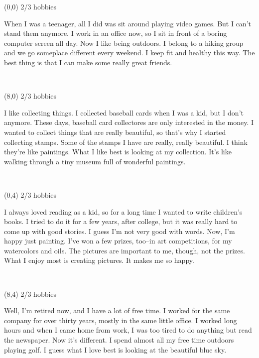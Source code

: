 \documentclass[a4paper]{article}
\newcommand{\mycard}[5]{%
	\vspace{0.1cm}
	\small #1 #2
	\par
	\parbox[t][6.7cm][c]{9.5cm}{%
	\hspace{0.1cm} \large#3 \\
	\normalsize#4 #5
	}
}
\begin{document}
\begin{textblock}{8}(0,0)
\mycard{2/3}{hobbies}{\parbox{9.0cm}{
When I was a teenager, all I did was sit around playing video games. But I can't stand them anymore. I work in an office now, so I sit in front of a boring computer screen all day. Now I like being outdoors. I belong to a hiking group and we go someplace different every weekend. I keep fit and healthy this way. The best thing is that I can make some really great friends.
}}{}{} 
\end{textblock}

\begin{textblock}{8}(8,0)
\mycard{2/3}{hobbies}{\parbox{9.0cm}{
I like collecting things. I collected baseball cards when I was a kid, but I don't anymore. These days, baseball card collectores are only interested in the money. I wanted to collect things that are really beautiful, so that's why I started collecting stamps. Some of the stamps I have are really, really beautiful. I think they're like paintings. What I like best is looking at my collection. It's like walking through a tiny museum full of wonderful paintings.
}}{}{} 
\end{textblock}

\begin{textblock}{8}(0,4)
\mycard{2/3}{hobbies}{\parbox{9.0cm}{
I always loved reading as a kid, so for a long time I wanted to write children's books. I tried to do it for a few years, after college, but it was really hard to come up with good stories. I guess I'm not very good with words. Now, I'm happy just painting. I've won a few prizes, too--in art competitions, for my watercolors and oils. The pictures are important to me, though, not the prizes. What I enjoy most is creating pictures. It makes me so happy.
}}{}{} 
\end{textblock}

\begin{textblock}{8}(8,4)
\mycard{2/3}{hobbies}{\parbox{9.0cm}{
Well, I'm retired now, and I have a lot of free time. I worked for the same company for over thirty years, mostly in the same little office. I worked long hours and when I came home from work, I was too tired to do anything but read the newspaper. Now it's different. I spend almost all my free time outdoors playing golf. I guess what I love best is looking at the beautiful blue sky.
}}{}{} 
\end{textblock}
\end{document}
